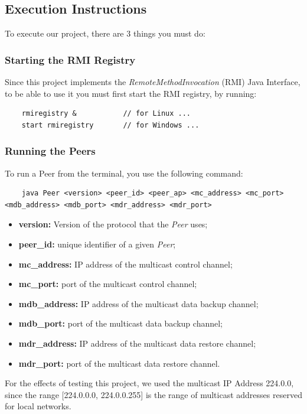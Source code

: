\documentclass[a4paper]{article}
\begin{document}
\subsection{Execution Instructions}
To execute our project, there are 3 things you must do:
\subsubsection{Starting the RMI Registry}
Since this project implements the \textit{RemoteMethodInvocation} (RMI) Java Interface, to be able to use it you must first
start the RMI registry, by running:
\begin{lstlisting}
    rmiregistry &           // for Linux ...
    start rmiregistry       // for Windows ...
\end{lstlisting}

\subsubsection{Running the Peers}
To run a Peer from the terminal, you use the following command:
\begin{lstlisting}
    java Peer <version> <peer_id> <peer_ap> <mc_address> <mc_port> <mdb_address> <mdb_port> <mdr_address> <mdr_port>
\end{lstlisting}
\begin{itemize}
    \item \textbf{version:} Version of the protocol that the \textit{Peer} uses;
    \item \textbf{peer\_id:} unique identifier of a given \textit{Peer};
    \item \textbf{mc\_address:} IP address of the multicast control channel;
    \item \textbf{mc\_port:} port of the multicast control channel;
    \item \textbf{mdb\_address:} IP address of the multicast data backup channel;
    \item \textbf{mdb\_port:} port of the multicast data backup channel;
    \item \textbf{mdr\_address:} IP address of the multicast data restore channel;
    \item \textbf{mdr\_port:} port of the multicast data restore channel.
\end{itemize}
For the effects of testing this project, we used the multicast IP Address 224.0.0, since the 
range [224.0.0.0, 224.0.0.255] is the range of multicast addresses reserved for local networks.
\end{document}
